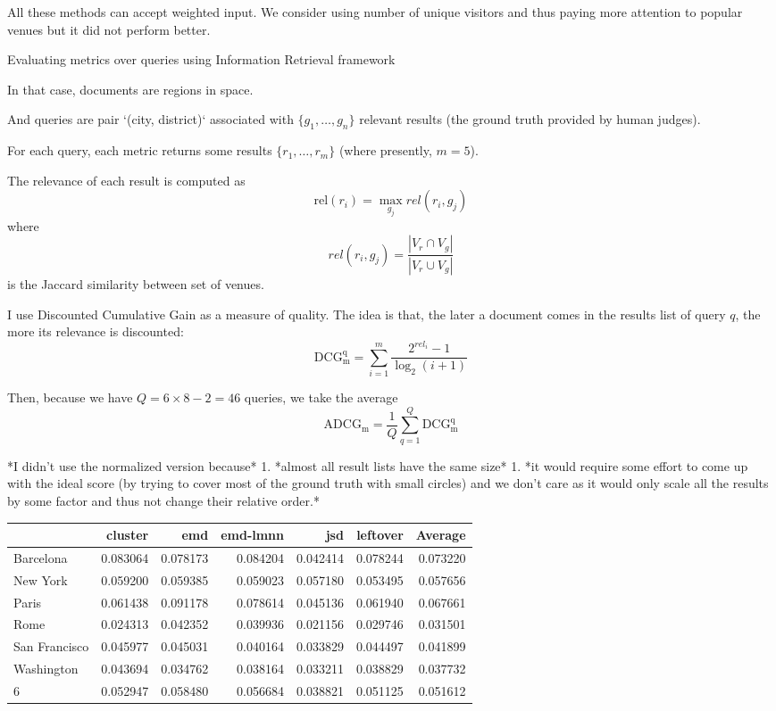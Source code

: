 All these methods can accept weighted input. We consider using number of
unique visitors and thus paying more attention to popular venues but it did
not perform better.

Evaluating metrics over queries using Information Retrieval framework

In that case, documents are regions in space.

And queries are pair `(city, district)` associated with $\{g_1, \ldots, g_n\}$ relevant results (the ground truth provided by human judges).

For each query, each metric returns some results $\{r_1, \ldots, r_m\}$ (where presently, $m=5$).

The relevance of each result is computed as 
$$
\mathrm{rel}(r_i) = \max_{g_j} rel(r_i, g_j)
$$
where $$rel(r_i, g_j) = \frac{| V_r \cap V_g|}{|V_r \cup V_g|}$$ is the Jaccard similarity between set of venues.

I use Discounted Cumulative Gain as a measure of quality. The idea is that, the later a document comes in the results list of query $q$, the more its relevance is discounted:
$$ \mathrm{DCG_{m}^q} = \sum_{i=1}^{m} \frac{ 2^{rel_{i}} - 1 }{ \log_{2}(i+1)} $$

Then, because we have $Q = 6\times 8 - 2 = 46$ queries, we take the average $$ \mathrm{ADCG_{m}} = \frac{1}{Q}\sum_{q=1}^Q \mathrm{DCG_{m}^q} $$

*I didn't use the normalized version because*
1. *almost all result lists have the same size*
1. *it would require some effort to come up with the ideal score (by trying to cover most of the ground truth with small circles) and we don't care as it would only scale all the results by some factor and thus not change their relative order.*

\begin{tabular}{lrrrrrr}
\toprule
{} &   cluster &       emd &  emd-lmnn &       jsd &  leftover &   Average \\
\midrule
Barcelona     &  0.083064 &  0.078173 &  0.084204 &  0.042414 &  0.078244 &  0.073220 \\
New York      &  0.059200 &  0.059385 &  0.059023 &  0.057180 &  0.053495 &  0.057656 \\
Paris         &  0.061438 &  0.091178 &  0.078614 &  0.045136 &  0.061940 &  0.067661 \\
Rome          &  0.024313 &  0.042352 &  0.039936 &  0.021156 &  0.029746 &  0.031501 \\
San Francisco &  0.045977 &  0.045031 &  0.040164 &  0.033829 &  0.044497 &  0.041899 \\
Washington    &  0.043694 &  0.034762 &  0.038164 &  0.033211 &  0.038829 &  0.037732 \\
6             &  0.052947 &  0.058480 &  0.056684 &  0.038821 &  0.051125 &  0.051612 \\
\bottomrule
\end{tabular}
